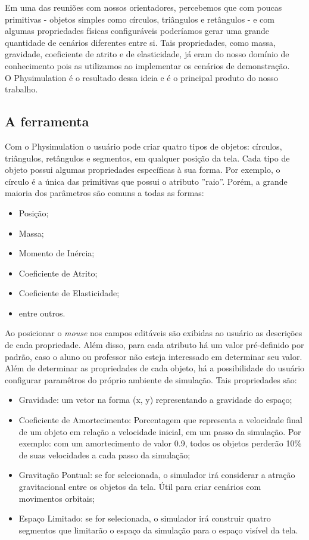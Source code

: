 Em uma das reuniões com nossos orientadores, percebemos que com poucas primitivas - objetos simples como círculos, triângulos e retângulos - e com algumas propriedades físicas configuráveis poderíamos gerar uma grande quantidade de cenários diferentes entre si. Tais propriedades, como massa, gravidade, coeficiente de atrito e de elasticidade, já eram do nosso domínio de conhecimento pois as utilizamos ao implementar os cenários de demonstração. \\

O Physimulation é o resultado dessa ideia e é o principal produto do nosso trabalho.

\subsection{A ferramenta}
Com o Physimulation o usuário pode criar quatro tipos de objetos: círculos, triângulos, retângulos e segmentos, em qualquer posição da tela. Cada tipo de objeto possui algumas propriedades específicas à sua forma. Por exemplo, o círculo é a única das primitivas que possui o atributo ''raio''. Porém, a grande maioria dos parâmetros são comuns a todas as formas:

\begin{itemize}
	\item Posição;
	\item Massa;
	\item Momento de Inércia;
	\item Coeficiente de Atrito;
	\item Coeficiente de Elasticidade;
	\item entre outros.
\end{itemize} 

Ao posicionar o \textit{mouse} nos campos editáveis são exibidas ao usuário as descrições de cada propriedade. Além disso, para cada atributo há um valor pré-definido por padrão, caso o aluno ou professor não esteja interessado em determinar seu valor.\\

Além de determinar as propriedades de cada objeto, há a possibilidade do usuário configurar paramêtros do próprio ambiente de simulação. Tais propriedades são:

\begin{itemize}
	\item Gravidade: um vetor na forma (x, y) representando a gravidade do espaço;
	\item Coeficiente de Amortecimento: Porcentagem que representa a velocidade final de um objeto em relação a velocidade inicial, em um passo da simulação. Por exemplo: com um amortecimento de valor 0.9, todos os objetos perderão 10\% de suas velocidades a cada passo da simulação;
	\item Gravitação Pontual: se for selecionada, o simulador irá considerar a atração gravitacional entre os objetos da tela. Útil para criar cenários com movimentos orbitais;
	\item Espaço Limitado: se for selecionada, o simulador irá construir quatro segmentos que limitarão o espaço da simulação para o espaço visível da tela.
\end{itemize} 

